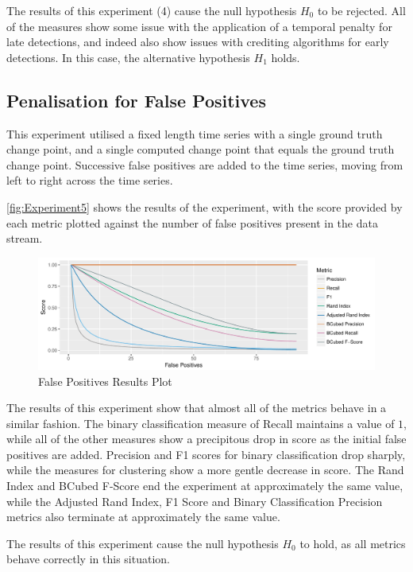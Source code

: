 \documentclass[../main.tex]{subfiles}
\begin{document}
The results of this experiment (4) cause the null hypothesis $H_0$ to be rejected. All of the measures show some issue with the application of a temporal penalty for late detections, and indeed also show issues with crediting algorithms for early detections. In this case, the alternative hypothesis $H_1$ holds.

\subsection{Penalisation for False Positives}

This experiment utilised a fixed length time series with a single ground truth change point, and a single computed change point that equals the ground truth change point. Successive false positives are added to the time series, moving from left to right across the time series.

\autoref{fig:Experiment5} shows the results of the experiment, with the score provided by each metric plotted against the number of false positives present in the data stream.

\begin{figure}[h]
    \includegraphics[width=\textwidth]{figures/Experiment5}
    \caption{False Positives Results Plot}
    \label{fig:Experiment5}
\end{figure}

The results of this experiment show that almost all of the metrics behave in a similar fashion. The binary classification measure of Recall maintains a value of $1$, while all of the other measures show a precipitous drop in score as the initial false positives are added. Precision and F1 scores for binary classification drop sharply, while the measures for clustering show a more gentle decrease in score. The Rand Index and BCubed F-Score end the experiment at approximately the same value, while the Adjusted Rand Index, F1 Score and Binary Classification Precision metrics also terminate at approximately the same value.

The results of this experiment cause the null hypothesis $H_0$ to hold, as all metrics behave correctly in this situation.
\end{document}
